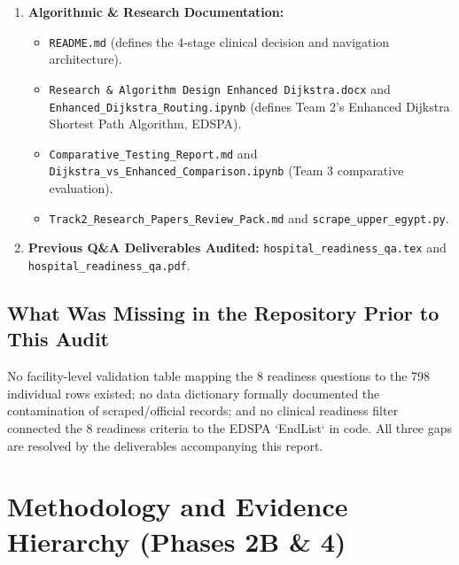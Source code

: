 \documentclass[10pt,a4paper]{article}
\begin{document}
\begin{enumerate}
\begin{itemize}
    \end{itemize}
    \item \textbf{Algorithmic \& Research Documentation:}
    \begin{itemize}
        \item \texttt{README.md} (defines the 4-stage clinical decision and navigation architecture).
        \item \texttt{Research \& Algorithm Design Enhanced Dijkstra.docx} and \texttt{Enhanced\_Dijkstra\_Routing.ipynb} (defines Team 2's Enhanced Dijkstra Shortest Path Algorithm, EDSPA).
        \item \texttt{Comparative\_Testing\_Report.md} and \texttt{Dijkstra\_vs\_Enhanced\_Comparison.ipynb} (Team 3 comparative evaluation).
        \item \texttt{Track2\_Research\_Papers\_Review\_Pack.md} and \texttt{scrape\_upper\_egypt.py}.
    \end{itemize}
    \item \textbf{Previous Q\&A Deliverables Audited:} \texttt{hospital\_readiness\_qa.tex} and \texttt{hospital\_readiness\_qa.pdf}.
\end{enumerate}

\subsection{What Was Missing in the Repository Prior to This Audit}
No facility-level validation table mapping the 8 readiness questions to the 798 individual rows existed; no data dictionary formally documented the contamination of scraped/official records; and no clinical readiness filter connected the 8 readiness criteria to the EDSPA `EndList` in code. All three gaps are resolved by the deliverables accompanying this report.

\section{Methodology and Evidence Hierarchy (Phases 2B \& 4)}
\end{document}
